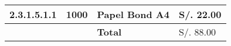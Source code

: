 \begin{table}[h!]
\begin{tabular}{|p{2.2cm}|p{1.8cm}|p{3.8cm}|p{2.2cm}|}
                2.3.1.5.1.1 &
                1000 &
                Papel Bond A4 &
                S/. 22.00
                \\ \hline

                &
                &
                \bf{Total} &
                S/. 88.00
                \\ \hline


                \end{tabular}
            \end{table}
